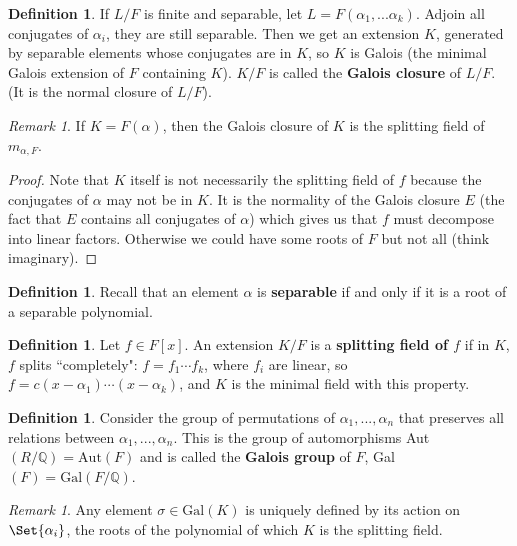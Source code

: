 \documentclass[9pt,reqno,twoside]{amsbook}
\theoremstyle{plain}
\numberwithin{section}{chapter}
\numberwithin{equation}{chapter}
\theoremstyle{definition}
\newtheorem{Def}[theorem]{Definition}
\theoremstyle{remark}
\newtheorem{rem}[theorem]{Remark}
\theoremstyle{plain}
\newcommand{\Q}{\mathbb{Q}}
\newcommand{\gal}{\mathrm{Gal}}
\begin{document}
\begin{Def}
If $L/F$ is finite and separable, let $L = F(\alpha_1,...\alpha_k)$. Adjoin all conjugates of $\alpha_i$, they are still separable. Then we get an extension $K$, generated by separable elements whose conjugates are in $K$, so $K$ is Galois (the minimal Galois extension of $F$ containing $K$). $K/F$ is called the \textbf{Galois closure} of $L/F$. (It is the normal closure of $L/F$). 
\end{Def}

\begin{rem}
If $K = F(\alpha)$, then the Galois closure of $K$ is the splitting field of $m_{\alpha,F}$. 
\end{rem}

\begin{proof}
Note that $K$ itself is not necessarily the splitting field of $f$ because the conjugates of $\alpha$ may not be in $K$. It is the normality of the Galois closure $E$ (the fact that $E$ contains all conjugates of $\alpha$) which gives us that $f$ must decompose into linear factors. Otherwise we could have some roots of $F$ but not all (think imaginary). 
\end{proof}

\begin{Def}
Recall that an element $\alpha$ is \textbf{separable} if and only if it is a root of a separable polynomial. 
\end{Def}

\begin{Def}
Let $f \in F[x]$. An extension $K/F$ is a \textbf{splitting field of $f$ }if in $K$, $f$ splits ``completely": $f = f_1\cdots f_k$, where $f_i$ are linear, so $f = c(x - \alpha_1)\cdots(x - \alpha_k)$, and $K$ is the minimal field with this property. 
\end{Def}

\begin{Def}
Consider the group of permutations of $\alpha_1,...,\alpha_n$ that preserves all relations between $\alpha_1,...,\alpha_n$. This is the group of automorphisms Aut$(R/\Q) = \text{Aut}(F)$ and is called the \textbf{Galois group} of $F$, Gal$(F) = \text{Gal}(F/\Q)$. 
\end{Def}

\begin{rem}
Any element $\sigma \in \gal(K)$ is uniquely defined by its action on $\Set{\alpha_i}$, the roots of the polynomial of which $K$ is the splitting field. 
\end{rem}
\end{document}
